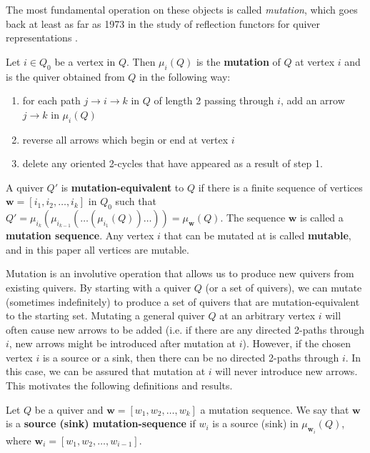 \documentclass[ALCO,Unicode]{cedram}
\newcommand{\bw}{{\boldsymbol{w}}}
\begin{document}
The most fundamental operation on these objects is called \textit{mutation}, which goes back at least as far as 1973 in the study of reflection functors for quiver representations \cite{MR0393065}.

\begin{defi}\label{def-mutation}
    Let $i \in Q_0$ be a vertex in $Q$. 
    Then $\mu_i (Q)$ is the \textbf{mutation} of $Q$ at vertex $i$ and is the quiver obtained from $Q$ in the following way:
    \begin{enumerate}
        \item for each path $j \to i \to k$ in $Q$ of length 2 passing through $i$, add an arrow $j \to k$ in $\mu_i (Q)$
        \item reverse all arrows which begin or end at vertex $i$
        \item delete any oriented 2-cycles that have appeared as a result of step 1.
    \end{enumerate}
    A quiver $Q'$ is \textbf{mutation-equivalent} to $Q$ if there is a finite sequence of vertices $\bw = [i_1, i_2, \ldots, i_k]$ in $Q_0$ such that $Q' = \mu_{i_k}(\mu_{i_{k-1}}(\ldots(\mu_{i_1}(Q))\ldots)) = \mu_\bw(Q)$.
    The sequence $\bw$ is called a \textbf{mutation sequence}.
    Any vertex $i$ that can be mutated at is called \textbf{mutable}, and in this paper all vertices are mutable.
\end{defi}

Mutation is an involutive operation that allows us to produce new quivers from existing quivers.
By starting with a quiver $Q$ (or a set of quivers), we can mutate (sometimes indefinitely) to produce a set of quivers that are mutation-equivalent to the starting set.
Mutating a general quiver $Q$ at an arbitrary vertex $i$ will often cause new arrows to be added (i.e. if there are any directed 2-paths through $i$, new arrows might be introduced after mutation at $i$).
However, if the chosen vertex $i$ is a source or a sink, then there can be no directed 2-paths through $i$.
In this case, we can be assured that mutation at $i$ will never introduce new arrows.
This motivates the following definitions and results.

\begin{defi} \label{def-source-sink-mutation}
    Let $Q$ be a quiver and $\bw = [w_1, w_2, \dots, w_k]$ a mutation sequence.
    We say that $\bw$ is a \textbf{source (sink) mutation-sequence} if $w_i$ is a source (sink) in $\mu_{\bw_i}(Q)$, where $\bw_i = [w_1, w_2, \dots, w_{i-1}]$.
\end{defi}
\end{document}
